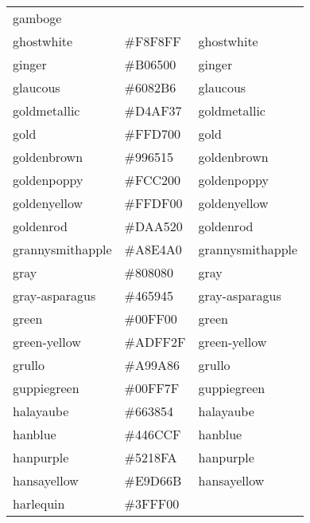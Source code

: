\documentclass[
]{article}
\begin{document}
\begin{longtable}[]{@{}lll@{}}
\textcolor[rgb]{0.89,0.61,0.06}{gamboge               }\tabularnewline
ghostwhite & \colorbox[rgb]{0.97,0.97,1.0}{\#F8F8FF} &
\textcolor[rgb]{0.97,0.97,1.0}{ghostwhite            }\tabularnewline
ginger & \colorbox[rgb]{0.69,0.4,0.0}{\#B06500} &
\textcolor[rgb]{0.69,0.4,0.0}{ginger                }\tabularnewline
glaucous & \colorbox[rgb]{0.38,0.51,0.71}{\#6082B6} &
\textcolor[rgb]{0.38,0.51,0.71}{glaucous              }\tabularnewline
goldmetallic & \colorbox[rgb]{0.83,0.69,0.22}{\#D4AF37} &
\textcolor[rgb]{0.83,0.69,0.22}{goldmetallic          }\tabularnewline
gold & \colorbox[rgb]{1.0,0.84,0.0}{\#FFD700} &
\textcolor[rgb]{1.0,0.84,0.0}{gold                  }\tabularnewline
goldenbrown & \colorbox[rgb]{0.6,0.4,0.08}{\#996515} &
\textcolor[rgb]{0.6,0.4,0.08}{goldenbrown           }\tabularnewline
goldenpoppy & \colorbox[rgb]{0.99,0.76,0.0}{\#FCC200} &
\textcolor[rgb]{0.99,0.76,0.0}{goldenpoppy           }\tabularnewline
goldenyellow & \colorbox[rgb]{1.0,0.87,0.0}{\#FFDF00} &
\textcolor[rgb]{1.0,0.87,0.0}{goldenyellow          }\tabularnewline
goldenrod & \colorbox[rgb]{0.85,0.65,0.13}{\#DAA520} &
\textcolor[rgb]{0.85,0.65,0.13}{goldenrod             }\tabularnewline
grannysmithapple & \colorbox[rgb]{0.66,0.89,0.63}{\#A8E4A0} &
\textcolor[rgb]{0.66,0.89,0.63}{grannysmithapple      }\tabularnewline
gray & \colorbox[rgb]{0.5,0.5,0.5}{\#808080} &
\textcolor[rgb]{0.5,0.5,0.5}{gray                  }\tabularnewline
gray-asparagus & \colorbox[rgb]{0.27,0.35,0.27}{\#465945} &
\textcolor[rgb]{0.27,0.35,0.27}{gray-asparagus        }\tabularnewline
green & \colorbox[rgb]{0.0,1.0,0.0}{\#00FF00} &
\textcolor[rgb]{0.0,1.0,0.0}{green                 }\tabularnewline
green-yellow & \colorbox[rgb]{0.68,1.0,0.18}{\#ADFF2F} &
\textcolor[rgb]{0.68,1.0,0.18}{green-yellow          }\tabularnewline
grullo & \colorbox[rgb]{0.66,0.6,0.53}{\#A99A86} &
\textcolor[rgb]{0.66,0.6,0.53}{grullo                }\tabularnewline
guppiegreen & \colorbox[rgb]{0.0,1.0,0.5}{\#00FF7F} &
\textcolor[rgb]{0.0,1.0,0.5}{guppiegreen           }\tabularnewline
halayaube & \colorbox[rgb]{0.4,0.22,0.33}{\#663854} &
\textcolor[rgb]{0.4,0.22,0.33}{halayaube             }\tabularnewline
hanblue & \colorbox[rgb]{0.27,0.42,0.81}{\#446CCF} &
\textcolor[rgb]{0.27,0.42,0.81}{hanblue               }\tabularnewline
hanpurple & \colorbox[rgb]{0.32,0.09,0.98}{\#5218FA} &
\textcolor[rgb]{0.32,0.09,0.98}{hanpurple             }\tabularnewline
hansayellow & \colorbox[rgb]{0.91,0.84,0.42}{\#E9D66B} &
\textcolor[rgb]{0.91,0.84,0.42}{hansayellow           }\tabularnewline
harlequin & \colorbox[rgb]{0.25,1.0,0.0}{\#3FFF00} &

\end{longtable}
\end{document}
